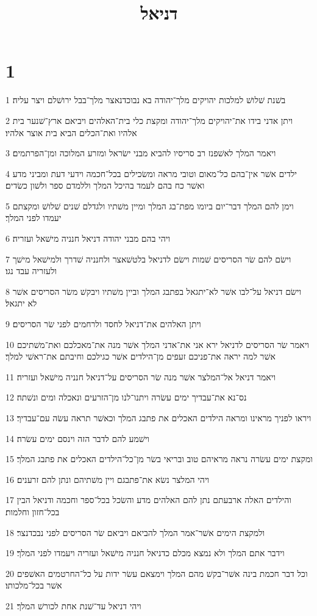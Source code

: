 

\title{דניאל}


\chapter{1}

\par 1 בשׁנת שׁלושׁ למלכות יהויקים מלך־יהודה בא נבוכדנאצר מלך־בבל ירושׁלם ויצר עליה׃
\par 2 ויתן אדני בידו את־יהויקים מלך־יהודה ומקצת כלי בית־האלהים ויביאם ארץ־שׁנער בית אלהיו ואת־הכלים הביא בית אוצר אלהיו׃
\par 3 ויאמר המלך לאשׁפנז רב סריסיו להביא מבני ישׂראל ומזרע המלוכה ומן־הפרתמים׃
\par 4 ילדים אשׁר אין־בהם כל־מאום וטובי מראה ומשׂכילים בכל־חכמה וידעי דעת ומביני מדע ואשׁר כח בהם לעמד בהיכל המלך וללמדם ספר ולשׁון כשׂדים׃
\par 5 וימן להם המלך דבר־יום ביומו מפת־בג המלך ומיין משׁתיו ולגדלם שׁנים שׁלושׁ ומקצתם יעמדו לפני המלך׃
\par 6 ויהי בהם מבני יהודה דניאל חנניה מישׁאל ועזריה׃
\par 7 וישׂם להם שׂר הסריסים שׁמות וישׂם לדניאל בלטשׁאצר ולחנניה שׁדרך ולמישׁאל מישׁך ולעזריה עבד נגו׃
\par 8 וישׂם דניאל על־לבו אשׁר לא־יתגאל בפתבג המלך וביין משׁתיו ויבקשׁ משׂר הסריסים אשׁר לא יתגאל׃
\par 9 ויתן האלהים את־דניאל לחסד ולרחמים לפני שׂר הסריסים׃
\par 10 ויאמר שׂר הסריסים לדניאל ירא אני את־אדני המלך אשׁר מנה את־מאכלכם ואת־משׁתיכם אשׁר למה יראה את־פניכם זעפים מן־הילדים אשׁר כגילכם וחיבתם את־ראשׁי למלך׃
\par 11 ויאמר דניאל אל־המלצר אשׁר מנה שׂר הסריסים על־דניאל חנניה מישׁאל ועזריה׃
\par 12 נס־נא את־עבדיך ימים עשׂרה ויתנו־לנו מן־הזרעים ונאכלה ומים ונשׁתה׃
\par 13 ויראו לפניך מראינו ומראה הילדים האכלים את פתבג המלך וכאשׁר תראה עשׂה עם־עבדיך׃
\par 14 וישׁמע להם לדבר הזה וינסם ימים עשׂרה׃
\par 15 ומקצת ימים עשׂרה נראה מראיהם טוב ובריאי בשׂר מן־כל־הילדים האכלים את פתבג המלך׃
\par 16 ויהי המלצר נשׂא את־פתבגם ויין משׁתיהם ונתן להם זרענים׃
\par 17 והילדים האלה ארבעתם נתן להם האלהים מדע והשׂכל בכל־ספר וחכמה ודניאל הבין בכל־חזון וחלמות׃
\par 18 ולמקצת הימים אשׁר־אמר המלך להביאם ויביאם שׂר הסריסים לפני נבכדנצר׃
\par 19 וידבר אתם המלך ולא נמצא מכלם כדניאל חנניה מישׁאל ועזריה ויעמדו לפני המלך׃
\par 20 וכל דבר חכמת בינה אשׁר־בקשׁ מהם המלך וימצאם עשׂר ידות על כל־החרטמים האשׁפים אשׁר בכל־מלכותו׃
\par 21 ויהי דניאל עד־שׁנת אחת לכורשׁ המלך׃

